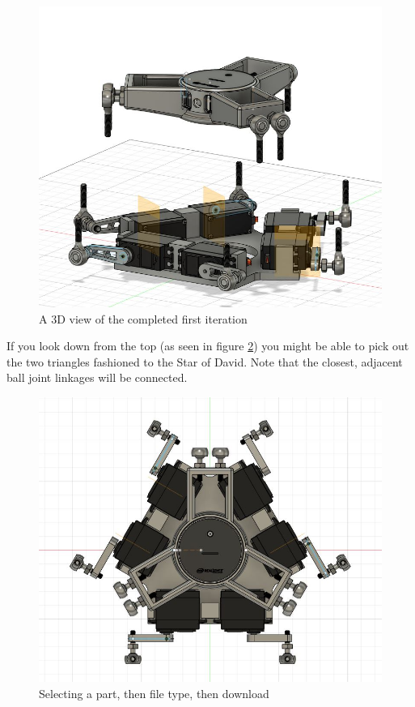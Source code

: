 \documentclass[a4paper, 10pt]{article}
\begin{document}
		\begin{figure} [!h]
			\centering
			\includegraphics[scale=0.35]{complete_assembly}
			\caption{A 3D view of the completed first iteration}
			\label{3D_view}
		\end{figure}

		If you look down from the top (as seen in figure \ref{top_down}) you might be able to pick out the two triangles fashioned to the Star of David. Note that the closest, adjacent ball joint linkages will be connected.
		
		\begin{figure} [!h]
			\centering
			\includegraphics[scale=0.4]{assembly_top_down}
			\caption{Selecting a part, then file type, then download}
			\label{top_down}
		\end{figure}
		
\end{document}
